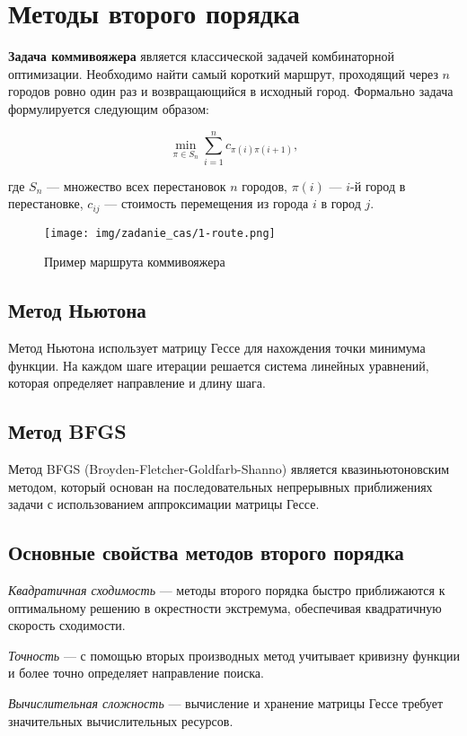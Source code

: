 \pagestyle{empty}
\thispagestyle{empty}
\chapter{Методы второго порядка}

\textbf{Задача коммивояжера} является классической задачей комбинаторной оптимизации. Необходимо найти самый короткий маршрут, проходящий через $n$ городов ровно один раз и возвращающийся в исходный город. Формально задача формулируется следующим образом:

\begin{equation}
    \min_{\pi \in S_n} \sum_{i=1}^{n} c_{\pi(i)\pi(i+1)},
    \label{eq:tsp}
\end{equation}

где $S_n$ --- множество всех перестановок $n$ городов, $\pi(i)$ --- $i$-й город в перестановке, $c_{ij}$ --- стоимость перемещения из города $i$ в город $j$.

\begin{figure}[h!]
    \centering
    \texttt{[image: img/zadanie\_cas/1-route.png]}
    \caption{Пример маршрута коммивояжера}
    \label{fig:tsp_example}
\end{figure}

\section{Метод Ньютона}

Метод Ньютона использует матрицу Гессе для нахождения точки минимума функции. На каждом шаге итерации решается система линейных уравнений, которая определяет направление и длину шага.

\section{Метод BFGS}

Метод BFGS (Broyden-Fletcher-Goldfarb-Shanno) является квазиньютоновским методом, который основан на последовательных непрерывных приближениях задачи с использованием аппроксимации матрицы Гессе.

\section{Основные свойства методов второго порядка}

\textit{Квадратичная сходимость} --- методы второго порядка быстро приближаются к оптимальному решению в окрестности экстремума, обеспечивая квадратичную скорость сходимости.

\textit{Точность} --- с помощью вторых производных метод учитывает кривизну функции и более точно определяет направление поиска.

\textit{Вычислительная сложность} --- вычисление и хранение матрицы Гессе требует значительных вычислительных ресурсов.